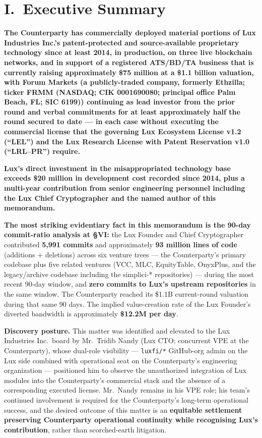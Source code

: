\documentclass[11pt,letterpaper]{article}
\begin{document}
\section*{I.\ Executive Summary}

\textbf{The Counterparty has commercially deployed material portions
of Lux Industries Inc.'s patent-protected and source-available
proprietary technology since at least 2014, in production, on three
live blockchain networks, and in support of a registered ATS/BD/TA
business that is currently raising approximately \$75 million at a
\$1.1 billion valuation, with \textbf{Forum Markets} (a publicly-traded
company, formerly Ethzilla; ticker \textbf{FRMM} (NASDAQ; CIK 0001690080; principal office Palm Beach, FL; SIC 6199)) continuing as lead investor from the prior round
and verbal commitments for at least approximately half the round
secured to date --- in each case without executing the commercial
license that the governing Lux Ecosystem License v1.2
(``LEL'') and the Lux Research License with Patent Reservation v1.0
(``LRL--PR'') require.}

\textbf{Lux's direct investment in the misappropriated technology
base exceeds \$20 million in development cost recorded since 2014,
plus a multi-year contribution from senior engineering personnel
including the Lux Chief Cryptographer and the named author of this
memorandum.}

\textbf{The most striking evidentiary fact in this memorandum is the
90-day commit-ratio analysis at \S VI:} the Lux Founder and Chief
Cryptographer contributed \textbf{5,991 commits} and approximately
\textbf{93 million lines of code} (additions + deletions) across six
venture trees --- the Counterparty's primary codebase plus five
related ventures (VCC, MLC, EquityTable, OnyxPlus, and the
legacy/archive codebase including the simplici-* repositories) ---
during the most recent 90-day window, and \textbf{zero commits to
Lux's upstream repositories} in the same window. The Counterparty
reached its \$1.1B current-round valuation during that same 90 days.
The implied value-creation rate of the Lux Founder's diverted
bandwidth is approximately \textbf{\$12.2M per day}.

\textbf{Discovery posture.} This matter was identified and elevated to
the Lux Industries Inc.\ board by Mr.\ Tridib Nandy (Lux CTO; concurrent
VPE at the Counterparty), whose dual-role visibility --- \texttt{luxfi/*}
GitHub-org admin on the Lux side combined with operational seat on the
Counterparty's engineering organization --- positioned him to observe
the unauthorized integration of Lux modules into the Counterparty's
commercial stack and the absence of a corresponding executed license.
Mr.\ Nandy remains in his VPE role; his team's continued involvement is
required for the Counterparty's long-term operational success, and the
desired outcome of this matter is an \textbf{equitable settlement
preserving Counterparty operational continuity while recognising Lux's
contribution}, rather than scorched-earth litigation.
\end{document}
